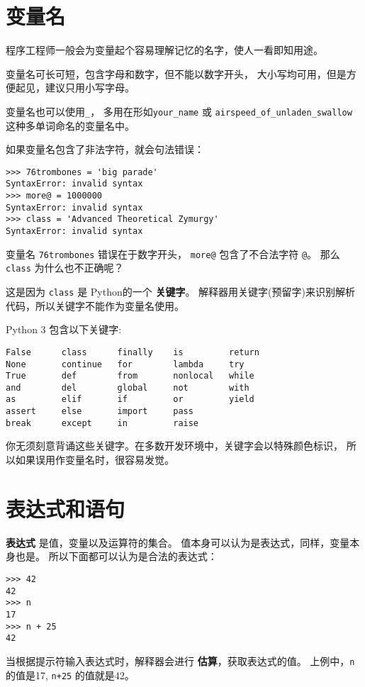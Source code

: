 \documentclass[10pt]{book}
\begin{document}
\section{变量名}

程序工程师一般会为变量起个容易理解记忆的名字，使人一看即知用途。

变量名可长可短，包含字母和数字，但不能以数字开头，
大小写均可用，但是方便起见，建议只用小写字母。

变量名也可以使用\verb"_"， 多用在形如\verb"your_name" 或 \verb"airspeed_of_unladen_swallow" 这种多单词命名的变量名中。

如果变量名包含了非法字符，就会句法错误：

\begin{verbatim}
>>> 76trombones = 'big parade'
SyntaxError: invalid syntax
>>> more@ = 1000000
SyntaxError: invalid syntax
>>> class = 'Advanced Theoretical Zymurgy'
SyntaxError: invalid syntax
\end{verbatim}
%
变量名 {\tt 76trombones}  错误在于数字开头，
{\tt more@} 包含了不合法字符 {\tt @}。
那么 {\tt class} 为什么也不正确呢？

这是因为 {\tt class} 是 Python的一个 {\bf 关键字}。
解释器用关键字(预留字)来识别解析代码，所以关键字不能作为变量名使用。

Python 3 包含以下关键字:

\begin{verbatim}
False      class      finally    is         return
None       continue   for        lambda     try
True       def        from       nonlocal   while
and        del        global     not        with
as         elif       if         or         yield
assert     else       import     pass
break      except     in         raise
\end{verbatim}
%

你无须刻意背诵这些关键字。在多数开发环境中，关键字会以特殊颜色标识，
所以如果误用作变量名时，很容易发觉。

\section{表达式和语句}

{\bf 表达式} 是值，变量以及运算符的集合。
值本身可以认为是表达式，同样，变量本身也是。
所以下面都可以认为是合法的表达式：

\begin{verbatim}
>>> 42
42
>>> n
17
>>> n + 25
42
\end{verbatim}
%
当根据提示符输入表达式时，解释器会进行 {\bf 估算}，获取表达式的值。
上例中，{\tt n} 的值是17, {\tt n+25} 的值就是42。
\end{document}
